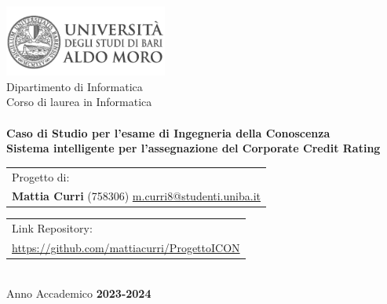 \begin{titlepage}
    \begin{center}
        \includegraphics[width=0.4\textwidth]{img/logo_uniba}\\
        \vspace{1cm}
        {\large Dipartimento di Informatica}\\
        \vspace{1cm}
        {\large Corso di laurea in Informatica}\\
        \hrulefill \\
        \vspace{2cm}
        {\large \textbf{Caso di Studio per l'esame di Ingegneria della Conoscenza}}\\
        \vspace{2cm}
        {\LARGE\textbf{Sistema intelligente per l'assegnazione del Corporate Credit Rating}}\\
        \vspace{2cm}

       \begin{table}[ht]
          \centering
          \begin{tabularx}{\textwidth}{@{}X@{}}
              Progetto di: \\
              \textbf{Mattia Curri} (758306) \href{mailto:m.curri8@studenti.uniba.it}{m.curri8@studenti.uniba.it} \\
          \end{tabularx}
      \end{table}
      \vspace{1cm}

      \begin{table}[ht]
        \centering
        \begin{tabularx}{\textwidth}{@{}X@{}}
            Link Repository: \\
            \href{https://github.com/mattiacurri/ProgettoICON}{https://github.com/mattiacurri/ProgettoICON} \\
        \end{tabularx}
    \end{table}

        \vspace{4cm}
        \hrulefill \\
        \vspace{1cm}
        {\large Anno Accademico \textbf{2023-2024}}
    \end{center}
\end{titlepage}